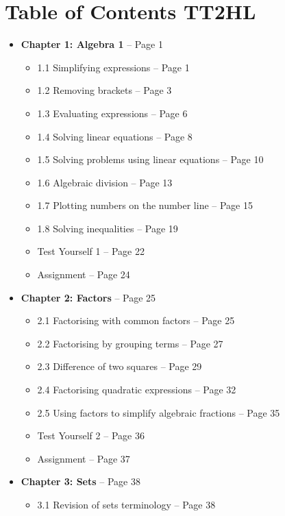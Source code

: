 \documentclass{article}
\begin{document}
\section*{Table of Contents TT2HL}

\begin{itemize}
    \item \textbf{Chapter 1: Algebra 1} -- Page 1
        \begin{itemize}
            \item 1.1 Simplifying expressions -- Page 1
            \item 1.2 Removing brackets -- Page 3
            \item 1.3 Evaluating expressions -- Page 6
            \item 1.4 Solving linear equations -- Page 8
            \item 1.5 Solving problems using linear equations -- Page 10
            \item 1.6 Algebraic division -- Page 13
            \item 1.7 Plotting numbers on the number line -- Page 15
            \item 1.8 Solving inequalities -- Page 19
            \item Test Yourself 1 -- Page 22
            \item Assignment -- Page 24
        \end{itemize}
    \item \textbf{Chapter 2: Factors} -- Page 25
        \begin{itemize}
            \item 2.1 Factorising with common factors -- Page 25
            \item 2.2 Factorising by grouping terms -- Page 27
            \item 2.3 Difference of two squares -- Page 29
            \item 2.4 Factorising quadratic expressions -- Page 32
            \item 2.5 Using factors to simplify algebraic fractions -- Page 35
            \item Test Yourself 2 -- Page 36
            \item Assignment -- Page 37
        \end{itemize}
    \item \textbf{Chapter 3: Sets} -- Page 38
        \begin{itemize}
            \item 3.1 Revision of sets terminology -- Page 38

\end{itemize}
\end{itemize}
\end{document}
